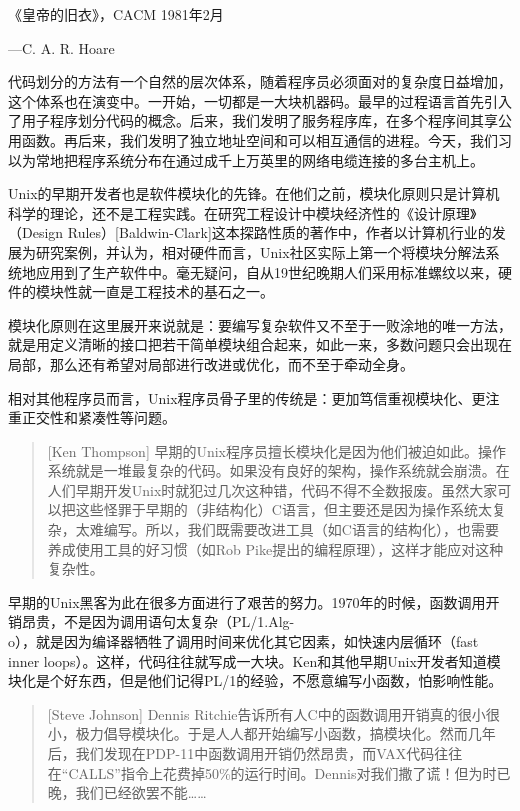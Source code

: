 \documentclass[11pt,oneside]{book}
\begin{document}
\begin{common-format}
\begin{flushright}
\begin{flashcard}[red!30]
《皇帝的旧衣》，CACM 1981年2月

{\hfill —C. A. R. Hoare}
\end{flashcard}
\end{flushright}

代码划分的方法有一个自然的层次体系，随着程序员必须面对的复杂度日益增加，这个体系也在演变中。一开始，一切都是一大块机器码。最早的过程语言首先引入了用子程序划分代码的概念。后来，我们发明了服务程序库，在多个程序间其享公用函数。再后来，我们发明了独立地址空间和可以相互通信的进程。今天，我们习以为常地把程序系统分布在通过成千上万英里的网络电缆连接的多台主机上。

Unix的早期开发者也是软件模块化的先锋。在他们之前，模块化原则只是计算机科学的理论，还不是工程实践。在研究工程设计中模块经济性的《设计原理》（Design Rules）[Baldwin-Clark]这本探路性质的著作中，作者以计算机行业的发展为研究案例，并认为，相对硬件而言，Unix社区实际上第一个将模块分解法系统地应用到了生产软件中。毫无疑问，自从19世纪晚期人们采用标准螺纹以来，硬件的模块性就一直是工程技术的基石之一。

模块化原则在这里展开来说就是：要编写复杂软件又不至于一败涂地的唯一方法，就是用定义清晰的接口把若干简单模块组合起来，如此一来，多数问题只会出现在局部，那么还有希望对局部进行改进或优化，而不至于牵动全身。

相对其他程序员而言，Unix程序员骨子里的传统是：更加笃信重视模块化、更注重正交性和紧凑性等问题。
\begin{quote}[Ken Thompson]
早期的Unix程序员擅长模块化是因为他们被迫如此。操作系统就是一堆最复杂的代码。如果没有良好的架构，操作系统就会崩溃。在人们早期开发Unix时就犯过几次这种错，代码不得不全数报废。虽然大家可以把这些怪罪于早期的（非结构化）C语言，但主要还是因为操作系统太复杂，太难编写。所以，我们既需要改进工具（如C语言的结构化），也需要养成使用工具的好习惯（如Rob Pike提出的编程原理），这样才能应对这种复杂性。
\end{quote}

早期的Unix黑客为此在很多方面进行了艰苦的努力。1970年的时候，函数调用开销昂贵，不是因为调用语句太复杂（PL/1.Alg-\\o），就是因为编译器牺牲了调用时间来优化其它因素，如快速内层循环（fast inner loops）。这样，代码往往就写成一大块。Ken和其他早期Unix开发者知道模块化是个好东西，但是他们记得PL/1的经验，不愿意编写小函数，怕影响性能。
\begin{quote}[Steve Johnson]
Dennis Ritchie告诉所有人C中的函数调用开销真的很小很小，极力倡导模块化。于是人人都开始编写小函数，搞模块化。然而几年后，我们发现在PDP-11中函数调用开销仍然昂贵，而VAX代码往往在“CALLS”指令上花费掉50\%的运行时间。Dennis对我们撒了谎！但为时已晚，我们已经欲罢不能……
\end{quote}


\end{common-format}
\end{document}
